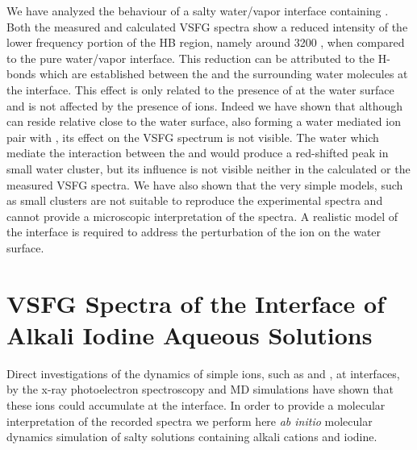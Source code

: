 We have analyzed the behaviour of a salty water/vapor interface containing \LiN.
Both the measured and calculated VSFG spectra show a reduced intensity of the lower frequency portion of
the HB region, namely around 3200 \centimeter, when compared to the pure water/vapor interface. 
This reduction can be attributed to the H-bonds which are established between the \nitrate and the surrounding water molecules at the interface.
This effect is only related to the presence of \nitrate at the water surface and is not affected by the presence of \Li ions.
Indeed we have shown that although \Li can reside relative close to the water surface, also forming a water mediated
ion pair with \nit, its effect on the VSFG spectrum is not visible. The water which mediate the interaction 
between the \nitrate and \Li would produce a red-shifted peak in small water cluster, but its influence is not visible 
neither in the calculated or the measured VSFG spectra. We have also shown that the very simple models,
such as small clusters are not suitable to reproduce the experimental spectra and cannot provide a microscopic interpretation of the spectra. 
A realistic model of the interface is required to address the perturbation of the ion on the water surface.

\section{VSFG Spectra of the Interface of Alkali Iodine Aqueous Solutions}\label{sfg_alkali_iodide_interface} %
Direct investigations of the dynamics 
of simple ions, such as \I and \br, at interfaces, 
by the x-ray photoelectron spectroscopy \cite{ghosal2005} and MD simulations \cite{PJ01,PJ02} 
have shown that these ions could accumulate at the interface.
In order to provide a molecular interpretation of the recorded spectra we perform here \emph{ab initio} molecular dynamics simulation of salty solutions containing alkali cations
and iodine. %

